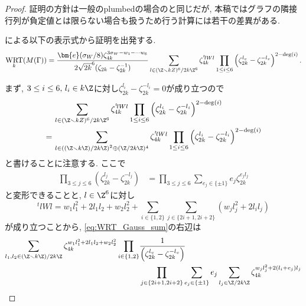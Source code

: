 \documentclass[11pt,b5paper,oneside,lualatex]{ltjsarticle} %
\DeclareMathOperator{\WRT}{WRT}
\numberwithin{equation}{section} %
\begin{document}
\begin{proof}%
	証明の方針は一般のplumbedの場合の\cite[命題3.2]{Mura}と同じだが, 本稿ではグラフの隣接行列が負定値とは限らない場合も扱うため行う計算には若干の差異がある. 
	
	\cite[Equation A.12]{GPPV}による以下の表示式から証明を出発する. 
	\begin{align} \label{eqn:WRT}
		\WRT_k(M(\Gamma))
		=
		\frac{\bm{e}(\sigma_W/8) \zeta_{4k}^{3\sigma_W - w_1 - \cdots w_6}}
		{2 \sqrt{2k}^6 (\zeta_{2k} - \zeta_{2k}^{-1})}
		\sum_{l \in (\Z \smallsetminus kZ)^6/2k\Z^6} \zeta_{4k}^{{}^t\!l W l}
		\prod_{1 \le i \le 6} \left( \zeta_{2k}^{l_v} - \zeta_{2k}^{-l_v} \right)^{2-\deg(i)}.
	\end{align}	

	まず, $ 3 \le i \le 6, \, l_i \in k\Z $に対し$ \zeta_{2k}^{l_i} - \zeta_{2k}^{-l_i} = 0 $が成り立つので
	\begin{equation} \label{eq:WRT_Gauss_sum} 
		\begin{aligned}
			&\sum_{l \in (\Z \smallsetminus kZ)^6/2k\Z^6} \zeta_{4k}^{{}^t\!l W l}
			\prod_{1 \le i \le 6} \left( \zeta_{2k}^{l_i} - \zeta_{2k}^{-l_i} \right)^{2-\deg(i)} \\
			= \,
			&\sum_{l \in \left( (\Z \smallsetminus k\Z) / 2k\Z \right)^{2} \oplus (\Z/ 2k \Z)^{4}} 
			\zeta_{4k}^{{}^t\!l W l}
			\prod_{1 \le i \le 6} \left( \zeta_{2k}^{l_i} - \zeta_{2k}^{-l_i} \right)^{2-\deg(i)}
		\end{aligned}
	\end{equation}
	と書けることに注意する. 
	ここで
	\begin{align}
		\prod_{3 \le j \le 6} \left( \zeta_{2k}^{l_j} - \zeta_{2k}^{-l_j} \right)
		&= 
		\prod_{3 \le j \le 6} \sum_{e_j \in \{ \pm 1 \} } e_j \zeta_{2k}^{e_j l_j}
	\end{align}
	と変形できることと, $ l \in \Z^6 $に対し
	\[
	{}^t\!l W l
	= w_1 l_1^2 + 2 l_1 l_2 + w_2 l_2^2 + \sum_{i \in \{ 1, 2\}} \sum_{j \in \{ 2i+1, 2i+2 \}} \left( w_j l_j^2 + 2 l_i l_j \right)
	\]
	が成り立つことから, \cref{eq:WRT_Gauss_sum}の右辺は
	\begin{align}
		\sum_{l_1, l_2 \in (\Z \smallsetminus k\Z) / 2k\Z}
		\zeta_{4k}^{w_1 l_1^2 + 2 l_1 l_2 + w_2 l_2^2}
		\prod_{i \in \{ 1, 2\}}
		&\frac{1}{\left( \zeta_{2k}^{l_v} - \zeta_{2k}^{-l_v} \right)}
		\\
		&\prod_{j \in \{ 2i+1, 2i+2 \}} \sum_{e_j \in \{ \pm 1 \} } e_j
		\sum_{l_j \in \Z/ 2k \Z}
		\zeta_{4k}^{w_j l_j^2 + 2 (l_i + e_j) l_j}
	\end{align}

\end{proof}
\end{document}
